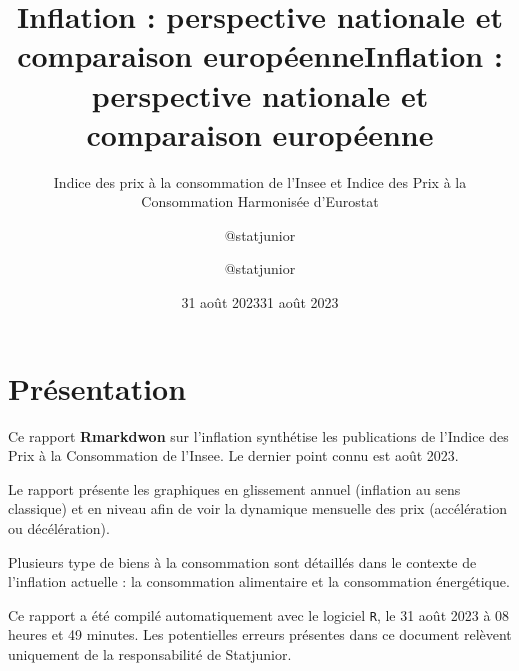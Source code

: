 \documentclass[
  paper=a4,
  ,captions=tableheading
]{scrartcl}
\title{Inflation : perspective nationale et comparaison européenne}
\subtitle{Indice des prix à la consommation de l'Insee et Indice des
Prix à la Consommation Harmonisée d'Eurostat}
\author{@statjunior}
\date{31 août 2023}
\title{Inflation : perspective nationale et comparaison européenne}
\author{@statjunior}
\date{31 août 2023}
\begin{document}
\begin{titlepage}
\afterpage{\restorepagecolor}
\newcommand{\colorRule}[3][black]{\textcolor[HTML]{#1}{\rule{#2}{#3}}}
\end{titlepage}
\restoregeometry
{} 




\hypertarget{pruxe9sentation}{%
\section{Présentation}\label{pruxe9sentation}}

Ce rapport \textbf{Rmarkdwon} sur l'inflation synthétise les
publications de l'Indice des Prix à la Consommation de l'Insee. Le
dernier point connu est août 2023.

Le rapport présente les graphiques en glissement annuel (inflation au
sens classique) et en niveau afin de voir la dynamique mensuelle des
prix (accélération ou décélération).

Plusieurs type de biens à la consommation sont détaillés dans le
contexte de l'inflation actuelle : la consommation alimentaire et la
consommation énergétique.

Ce rapport a été compilé automatiquement avec le logiciel \texttt{R}, le
31 août 2023 à 08 heures et 49 minutes. Les potentielles erreurs
présentes dans ce document relèvent uniquement de la responsabilité de
Statjunior.
\end{document}
